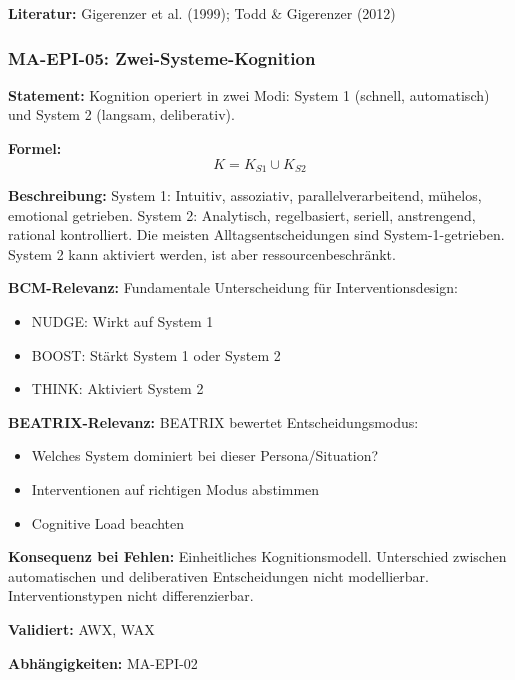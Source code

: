 \textbf{Literatur:} Gigerenzer et al. (1999); Todd \& Gigerenzer (2012)


\subsubsection*{MA-EPI-05: Zwei-Systeme-Kognition}

\textbf{Statement:} Kognition operiert in zwei Modi: System 1 (schnell, automatisch) und System 2 (langsam, deliberativ).

\textbf{Formel:}
\begin{equation}
K = K_{S1} \cup K_{S2}
\end{equation}

\textbf{Beschreibung:}
System 1: Intuitiv, assoziativ, parallelverarbeitend, mühelos, emotional getrieben.
System 2: Analytisch, regelbasiert, seriell, anstrengend, rational kontrolliert.
Die meisten Alltagsentscheidungen sind System-1-getrieben. System 2 kann aktiviert werden, ist aber ressourcenbeschränkt.

\textbf{BCM-Relevanz:}
Fundamentale Unterscheidung für Interventionsdesign:
\begin{itemize}
    \item NUDGE: Wirkt auf System 1
    \item BOOST: Stärkt System 1 oder System 2
    \item THINK: Aktiviert System 2
\end{itemize}

\textbf{BEATRIX-Relevanz:}
BEATRIX bewertet Entscheidungsmodus:
\begin{itemize}
    \item Welches System dominiert bei dieser Persona/Situation?
    \item Interventionen auf richtigen Modus abstimmen
    \item Cognitive Load beachten
\end{itemize}

\textbf{Konsequenz bei Fehlen:}
Einheitliches Kognitionsmodell. Unterschied zwischen automatischen und deliberativen Entscheidungen nicht modellierbar. Interventionstypen nicht differenzierbar.

\textbf{Validiert:} AWX, WAX

\textbf{Abhängigkeiten:} MA-EPI-02

